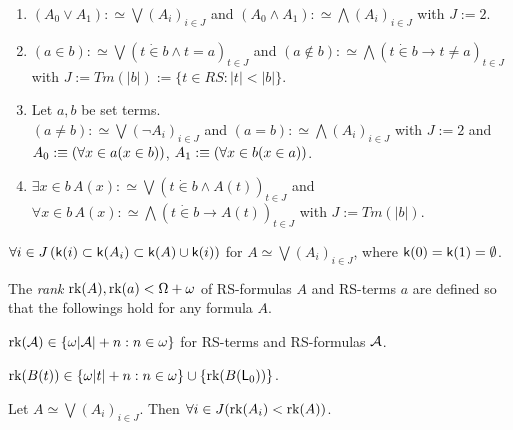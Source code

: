 \documentclass{article}
\begin{document}
\bdf\label{df:assigndc}
\begin{enumerate}

\item
$(A_{0}\lor A_{1}):\simeq\bigvee(A_{i})_{i\in J}$
{\rm and}
$(A_{0}\land A_{1}):\simeq\bigwedge(A_{i})_{i\in J}$
{\rm with} $J:=2$.

\item
$(a\in b):\simeq\bigvee(t\dot{\in}b\land t=a)_{t\in J}$
{\rm and}
$(a\not\in b):\simeq\bigwedge(t\dot{\in}b \to t\neq a)_{t\in J}$
{\rm with}
$J:=Tm(|b|):=\{t\in RS: |t|<|b|\}$.

\item
 {\rm Let $a,b$ be set terms.}
 \\
$(a\neq b):\simeq\bigvee(\lnot A_{i})_{i\in J}$
{\rm and}
$(a=b):\simeq\bigwedge(A_{i})_{i\in J}$
{\rm with} $J:=2$ {\rm and}
$A_{0}:\equiv(\forall x\in a(x\in b))$, $A_{1}:\equiv(\forall x\in b(x\in a))$.

 
\item
$
\exists x\in b\, A(x):\simeq\bigvee(t\dot{\in}b\land A(t))_{t\in J}$
{\rm and}
$
\forall x\in b\, A(x):\simeq\bigwedge(t\dot{\in}b \to A(t))_{t\in J}
$ 
{\rm with}
$
J:=Tm(|b|)$.



\end{enumerate}
\edf

\blem\label{prp:impdegreeKP.simeq.2}
$\forall i\in J\left({\sf k}(i)\subset{\sf k}(A_{i})\subset{\sf k}(A)\cup{\sf k}(i)\right)$
for $A\simeq\bigvee(A_{i})_{i\in J}$, where ${\sf k}(0)={\sf k}(1)=\emptyset$.
\elem




The \textit{rank} $\mbox{{\rm rk}}(A),\mbox{{\rm rk}}(a)<\Omega+\omega$ of RS-formulas $A$ 
and RS-terms $a$ are defined so that the followings hold for any formula $A$.

\bprp\label{prp:degreeKP}
\benu

\item\label{prp:impdegreeKP.-2}
$\mbox{{\rm rk}}({\cal A})\in\{\omega| {\cal A}|+n:n\in\omega\}$ for RS-terms and RS-formulas ${\cal A}$.

\item\label{prp:degreeKP2}
$\mbox{{\rm rk}}(B(t))\in\{\omega|t|+n:n\in\omega\}\cup\{\mbox{{\rm rk}}(B({\sf L}_{0}))\}$.

\item\label{prp:impdegreeKP}
Let $A\simeq\bigvee(A_{i})_{i\in J}$. Then
$\forall i\in J(\mbox{{\rm rk}}(A_{i})<\mbox{{\rm rk}}(A))$.
\eenu
\eprp
\end{document}
